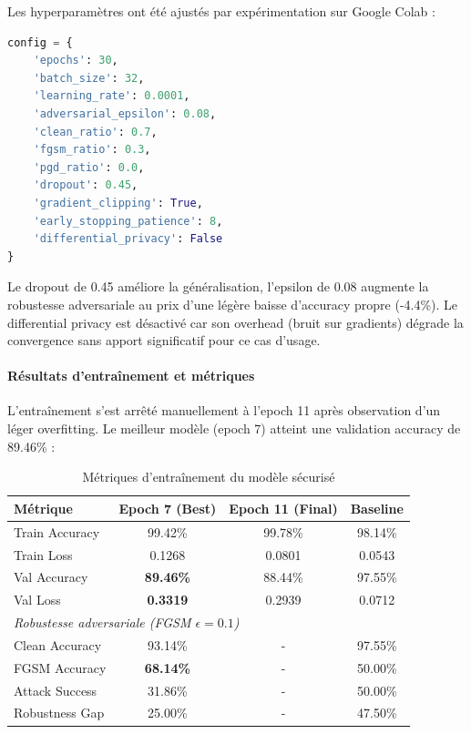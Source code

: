 Les hyperparamètres ont été ajustés par expérimentation sur Google Colab :

\begin{lstlisting}[language=Python, caption=Configuration optimisée d'entraînement]
config = {
    'epochs': 30,
    'batch_size': 32,
    'learning_rate': 0.0001,
    'adversarial_epsilon': 0.08,
    'clean_ratio': 0.7,
    'fgsm_ratio': 0.3,
    'pgd_ratio': 0.0,
    'dropout': 0.45,
    'gradient_clipping': True,
    'early_stopping_patience': 8,
    'differential_privacy': False
}
\end{lstlisting}

Le dropout de 0.45 améliore la généralisation, l'epsilon de 0.08 augmente la robustesse adversariale au prix d'une légère baisse d'accuracy propre (-4.4\%). Le differential privacy est désactivé car son overhead (bruit sur gradients) dégrade la convergence sans apport significatif pour ce cas d'usage.

\paragraph{Résultats d'entraînement et métriques}

L'entraînement s'est arrêté manuellement à l'epoch 11 après observation d'un léger overfitting. Le meilleur modèle (epoch 7) atteint une validation accuracy de 89.46\% :

\begin{table}[H]
    \centering
    \caption{Métriques d'entraînement du modèle sécurisé}
    \label{tab:secured_training_metrics}
    \begin{tabular}{lccc}
        \toprule
        \textbf{Métrique} & \textbf{Epoch 7 (Best)} & \textbf{Epoch 11 (Final)} & \textbf{Baseline} \\
        \midrule
        Train Accuracy & 99.42\% & 99.78\% & 98.14\% \\
        Train Loss & 0.1268 & 0.0801 & 0.0543 \\
        Val Accuracy & \textbf{89.46\%} & 88.44\% & 97.55\% \\
        Val Loss & \textbf{0.3319} & 0.2939 & 0.0712 \\
        \midrule
        \multicolumn{4}{l}{\textit{Robustesse adversariale (FGSM $\epsilon = 0.1$)}} \\
        Clean Accuracy & 93.14\% & - & 97.55\% \\
        FGSM Accuracy & \textbf{68.14\%} & - & 50.00\% \\
        Attack Success & 31.86\% & - & 50.00\% \\
        Robustness Gap & 25.00\% & - & 47.50\% \\
        \bottomrule
    \end{tabular}
\end{table}

